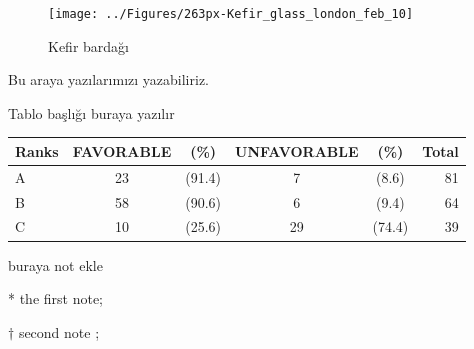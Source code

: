 \begin{figure}[tbph]
\centering
\texttt{[image: ../Figures/263px-Kefir\_glass\_london\_feb\_10]}
\caption[kfr]{Kefir bardağı}
\label{fig:263px-Kefir_glass_london_feb_10}
\end{figure}

Bu araya yazılarımızı yazabiliriz.

\begin{minipage}{\textwidth}
	\centering
	\begin{threeparttable}
		\caption{Tablo başlığı buraya yazılır}  \label{tablo:1} %
		\begin{tabular}{lccccr}
			\hline\hline
			Ranks & FAVORABLE \tnote{*} &(\%) & UNFAVORABLE &(\%) & Total \\
			 \hline
			A& 23 & (91.4) & 7 & (8.6) & 81 \\ 
			B& 58 & (90.6) & 6 & (9.4) & 64 \\ 
			C& 10 & (25.6) & 29 & (74.4) & 39 \\
			\hline
		\end{tabular}
		\begin{tablenotes}
			\footnotesize
			\item[] buraya not ekle\\
			\item[*] the first note; %
			\item[$\dag$] second note ; %
		\end{tablenotes}
	\end{threeparttable}
\end{minipage}




